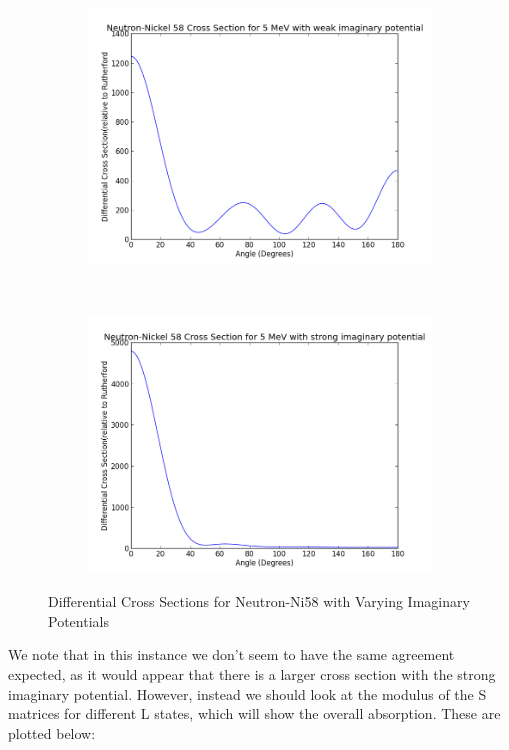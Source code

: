 \documentclass[paper=a4, fontsize=11pt]{scrartcl} %
\numberwithin{equation}{section} %
\numberwithin{figure}{section} %
\numberwithin{table}{section} %
\begin{document}
 \begin{figure}[hbt!]
        \centering
        \begin{subfigure}[b!]{0.35\textwidth}
                \includegraphics[width=\textwidth]{NeutronWeakcs.png}
        \end{subfigure}%
        ~ %
\quad
        \begin{subfigure}[b!]{0.35\textwidth}
                \includegraphics[width=\textwidth]{NeutronStrongcs.png}
        \end{subfigure}

        \caption{Differential Cross Sections for Neutron-Ni58 with Varying Imaginary Potentials}
\end{figure}
We note that in this instance we don't seem to have the same agreement expected, as it would appear that there is a larger cross section with the strong imaginary potential. However, instead we should look at the modulus of the S matrices for different L states, which will show the overall absorption. These are plotted below:\\
\end{document}
